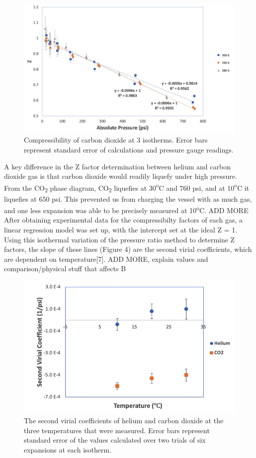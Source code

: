 \documentclass{article}
\begin{document}
\begin{figure}[H] \centering
\includegraphics[width=.8\textwidth]{images/ZvsP Co2.jpg}
\caption{\label{fig1}Compressibility of carbon dioxide at 3 isotherms. Error bars represent standard error of calculations and pressure gauge readings.}\end{figure}
\noindent
A key difference in the Z factor determination between helium and carbon dioxide gas is that carbon dioxide would readily liquefy under high pressure. From the CO{{\textsubscript{2}}} phase diagram, CO{{\textsubscript{2}}} liquefies at 30{\textsuperscript{o}}C and 760 psi, and at 10{\textsuperscript{o}}C it liquefies at 650 psi. This prevented us from charging the vessel with as much gas, and one less expansion was able to be precisely measured at 10{\textsuperscript{o}}C. ADD MORE\linebreak \linebreak
\noindent After obtaining experimental data for the compressibilty factors of each gas, a linear regression model was set up, with the intercept set at the ideal Z = 1. Using this isothermal variation of the pressure ratio method to determine Z factors, the slope of these lines (Figure 4) are the second virial coefficients, which are dependent on temperature[7]. ADD MORE, explain values and comparison/physical stuff that affects B

\begin{figure}[H] \centering
\includegraphics[width=1\textwidth]{images/NewB.jpg}
\caption{\label{fig1}The second virial coefficients of helium and carbon dioxide at the three temperatures that were measured. Error bars represent standard error of the values calculated over two trials of six expansions at each isotherm.}\end{figure}
\end{document}
